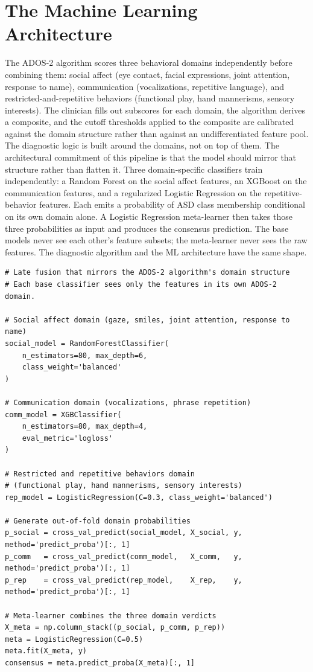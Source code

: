 \documentclass{obelus-preprint}
\begin{document}
\section{The Machine Learning Architecture}
The ADOS-2 algorithm scores three behavioral domains independently before combining them: social affect (eye contact, facial expressions, joint attention, response to name), communication (vocalizations, repetitive language), and restricted-and-repetitive behaviors (functional play, hand mannerisms, sensory interests). The clinician fills out subscores for each domain, the algorithm derives a composite, and the cutoff thresholds applied to the composite are calibrated against the domain structure rather than against an undifferentiated feature pool. The diagnostic logic is built around the domains, not on top of them.
The architectural commitment of this pipeline is that the model should mirror that structure rather than flatten it. Three domain-specific classifiers train independently: a Random Forest on the social affect features, an XGBoost on the communication features, and a regularized Logistic Regression on the repetitive-behavior features. Each emits a probability of ASD class membership conditional on its own domain alone. A Logistic Regression meta-learner then takes those three probabilities as input and produces the consensus prediction. The base models never see each other's feature subsets; the meta-learner never sees the raw features. The diagnostic algorithm and the ML architecture have the same shape.
\begin{verbatim}
# Late fusion that mirrors the ADOS-2 algorithm's domain structure
# Each base classifier sees only the features in its own ADOS-2 domain.

# Social affect domain (gaze, smiles, joint attention, response to name)
social_model = RandomForestClassifier(
    n_estimators=80, max_depth=6,
    class_weight='balanced'
)

# Communication domain (vocalizations, phrase repetition)
comm_model = XGBClassifier(
    n_estimators=80, max_depth=4,
    eval_metric='logloss'
)

# Restricted and repetitive behaviors domain
# (functional play, hand mannerisms, sensory interests)
rep_model = LogisticRegression(C=0.3, class_weight='balanced')

# Generate out-of-fold domain probabilities
p_social = cross_val_predict(social_model, X_social, y, method='predict_proba')[:, 1]
p_comm   = cross_val_predict(comm_model,   X_comm,   y, method='predict_proba')[:, 1]
p_rep    = cross_val_predict(rep_model,    X_rep,    y, method='predict_proba')[:, 1]

# Meta-learner combines the three domain verdicts
X_meta = np.column_stack((p_social, p_comm, p_rep))
meta = LogisticRegression(C=0.5)
meta.fit(X_meta, y)
consensus = meta.predict_proba(X_meta)[:, 1]
\end{verbatim}
\end{document}

